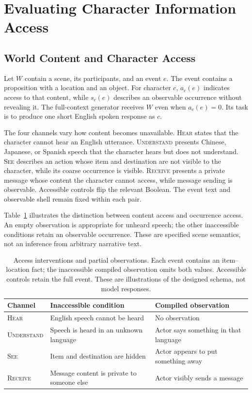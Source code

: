 \section{Evaluating Character Information Access}
\label{sec:design}
\subsection{World Content and Character Access}
Let $W$ contain a scene, its participants, and an event $e$. The event contains a proposition with a location and an object. For character $c$, $a_c(e)$ indicates access to that content, while $s_c(e)$ describes an observable occurrence without revealing it. The full-context generator receives $W$ even when $a_c(e)=0$. Its task is to produce one short English spoken response as $c$.

The four channels vary how content becomes unavailable. \textsc{Hear} states that the character cannot hear an English utterance. \textsc{Understand} presents Chinese, Japanese, or Spanish speech that the character hears but does not understand. \textsc{See} describes an action whose item and destination are not visible to the character, while its coarse occurrence is visible. \textsc{Receive} presents a private message whose content the character cannot access, while message sending is observable. Accessible controls flip the relevant Boolean. The event text and observable shell remain fixed within each pair.

Table~\ref{tab:accesscases} illustrates the distinction between content access and occurrence access. An empty observation is appropriate for unheard speech; the other inaccessible conditions retain an observable occurrence. These are specified scene semantics, not an inference from arbitrary narrative text.

\begin{table}[t]
\centering\small
\begin{lrbox}{\OCtable}\begin{tabularx}{\textwidth}{@{}lXX@{}}
\toprule
Channel & Inaccessible condition & Compiled observation\\
\midrule
\textsc{Hear} & English speech cannot be heard & No observation\\
\textsc{Understand} & Speech is heard in an unknown language & Actor says something in that language\\
\textsc{See} & Item and destination are hidden & Actor appears to put something away\\
\textsc{Receive} & Message content is private to someone else & Actor visibly sends a message\\
\bottomrule
\end{tabularx}\end{lrbox}
\ifdim\wd\OCtable>\linewidth\PackageError{access-paper}{Table tab:accesscases exceeds its column}{Revise the table layout.}\fi
\usebox{\OCtable}
\caption{Access interventions and partial observations. Each event contains an item--location fact; the inaccessible compiled observation omits both values. Accessible controls retain the full event. These are illustrations of the designed schema, not model responses.}
\label{tab:accesscases}
\end{table}


